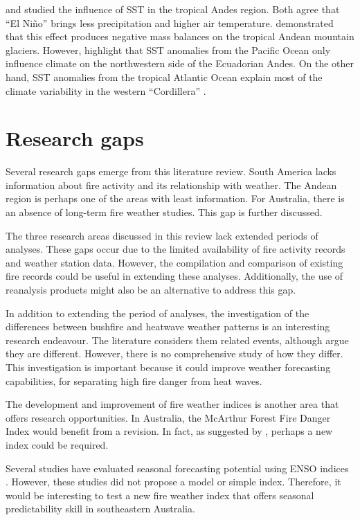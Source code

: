 \citet{Vuille2000} and \citet{Francou2004} studied the influence
of SST in the tropical Andes region. Both agree that \textquotedblleft El
Ni\~no\textquotedblright{} brings less precipitation and higher air
temperature. \citet{Francou2004} demonstrated that this effect produces
negative mass balances on the tropical Andean mountain glaciers. However,
\citet{Vuille2000} highlight that SST anomalies from the Pacific
Ocean only influence climate on the northwestern side of the Ecuadorian
Andes. On the other hand, SST anomalies from the tropical Atlantic
Ocean explain most of the climate variability in the western \textquotedblleft Cordillera\textquotedblright{}
.


\section{Research gaps}

Several research gaps emerge from this literature review. South America lacks information
about fire activity and its relationship with weather. The Andean
region is perhaps one of the areas with least information. For Australia, 
there is an absence of long-term fire weather studies. This gap is further discussed.

The three research areas discussed in this review lack extended periods
of analyses. These gaps occur due to the limited availability of fire activity
records and weather station data. However, the compilation and comparison
of existing fire records could be useful in extending these analyses.
Additionally, the use of reanalysis products might also be an alternative
to address this gap.

In addition to extending the period of analyses, the investigation
of the differences between bushfire and heatwave weather patterns
is an interesting research endeavour. The literature considers them
related events, although \citet{Reeder2015} argue they are different.
However, there is no comprehensive study of how they differ. This
investigation is important because it could improve weather forecasting
capabilities, for separating high fire danger from heat waves.

The development and improvement of fire weather indices is another
area that offers research opportunities. In Australia, the McArthur
Forest Fire Danger Index would benefit from a revision. In fact, as
suggested by \citet{Teague2010}, perhaps a new index could be required. 

Several studies have evaluated seasonal forecasting
potential using ENSO indices \citep{Nicholls2007,Harris2013}. However,
these studies did not propose a model or simple index. Therefore,
it would be interesting to test a new fire weather index that offers
seasonal predictability skill in southeastern Australia. 
